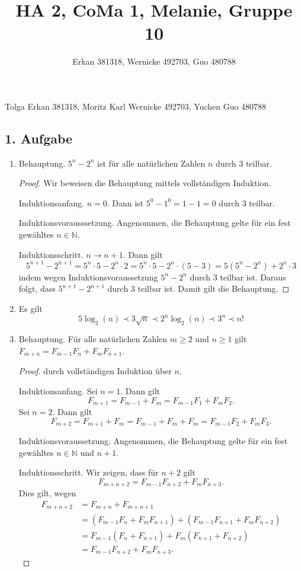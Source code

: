 \documentclass[draft,a5paper]{article}
\title{HA 2, CoMa 1, Melanie, Gruppe 10}
\author{Erkan 381318, Wernicke 492703, Guo 480788}
\theoremstyle{remark}
\begin{document}
\maketitle
\begin{center}
Tolga Erkan 381318,  Moritz Karl Wernicke 492703, Yuchen Guo 480788
\end{center}
\subsection{1. Aufgabe}
\begin{enumerate}
\item Behauptung.  \(5^{n} - 2^{n}\) ist für alle natürlichen Zahlen \(n\)
  durch \(3\) teilbar.
  \begin{proof}
    Wir beweisen die Behauptung mittels vollständigen Induktion.

    Induktionsanfang.  \(n=0\).  Dann ist \(5^{0} - 1^{0} = 1 - 1 = 0\)
    durch \(3\) teilbar.

    Induktionsvorausssetzung.  Angenommen, die Behauptung gelte für
    ein fest gewähltes \(n \in \mathbb{N}\).

    Induktionsschritt.  \(n \to n+1\).  Dann gilt
    \[5^{n+1} - 2^{n+1} = 5^{n} \cdot 5 - 2^{n} \cdot 2 = 5^{n} \cdot 5 - 2^{n}\cdot
      (5-3) = 5(5^{n} - 2^{n}) + 2^{n} \cdot 3\]
    indem wegen Induktionsvoraussetzung \(5^{n} - 2^{n}\) durch \(3\)
    teilbar ist.  Daraus folgt, dass \(5^{n+1} - 2^{n+1}\) durch \(3\)
    teilbar ist.  Damit gilt die Behauptung.
  \end{proof}
\item Es gilt
  \[5 \log_{2}(n) \prec 3\sqrt{n} \prec 2^{n}\log_{2}(n) \prec 3^{n} \prec n! \]
\item Behauptung.  Für alle natürlichen Zahlen \(m \ge 2\) und \(n \ge 1\)
  gilt \(F_{m+n} = F_{m-1}F_{n} + F_{m}F_{n+1}\).
  \begin{proof}
    durch vollständigen Induktion über \(n\).

    Induktionsanfang.  Sei \(n = 1\).  Dann gilt
    \[F_{m+1} = F_{m-1} + F_{m} = F_{m-1} F_{1} + F_{m} F_{2}.\]
    Sei \(n = 2\).  Dann gilt
    \[F_{m+2} = F_{m+1} + F_{m} = F_{m-1} + F_{m} + F_{m} = F_{m-1}
      F_{2} + F_{m} F_{3}.\]

    Induktionsvoraussetzung. Angenommen, die Behauptung gelte für
    ein fest gewähltes \(n \in \mathbb{N}\) und \(n+1\).

    Induktionsschritt.  Wir zeigen, dass für \(n+2\) gilt
    \[F_{m+n+2} = F_{m-1}F_{n+2} + F_{m}F_{n+3}.\]
    Dies gilt, wegen
    \begin{align*}
      F_{m+n+2} &= F_{m+n} + F_{m+n+1} \\
                &= (F_{m-1}F_{n} + F_{m}F_{n+1}) + (F_{m-1}F_{n+1} +
                  F_{m}F_{n+2}) \\
                &= F_{m-1}(F_{n} + F_{n+1}) + F_{m}(F_{n+1}+F_{n+2}) \\
                &= F_{m-1}F_{n+2} + F_{m}F_{n+3}.
    \end{align*}
  \end{proof}
\end{enumerate}
\end{document}

